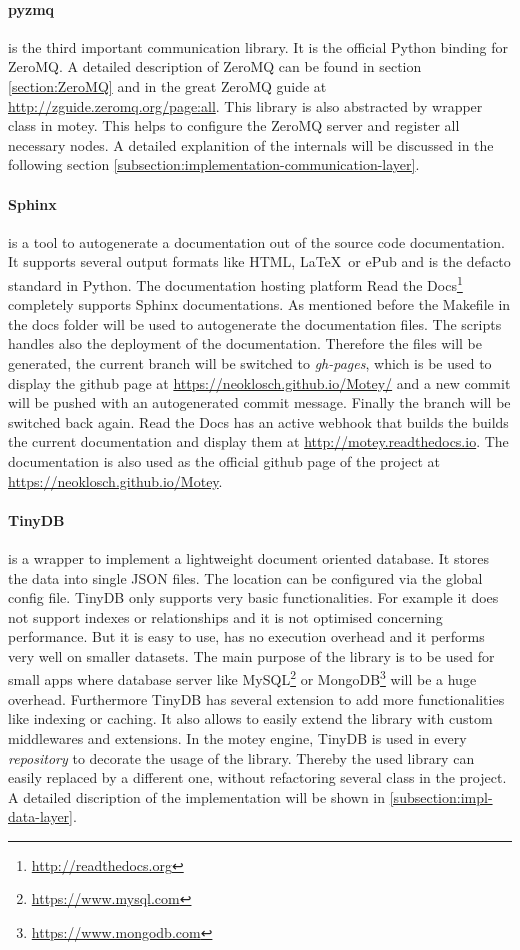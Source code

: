 \paragraph{pyzmq} is the third important communication library.
It is the official Python binding for ZeroMQ.
A detailed description of ZeroMQ can be found in section \ref{section:ZeroMQ} and in the great ZeroMQ guide at \url{http://zguide.zeromq.org/page:all}.
This library is also abstracted by wrapper class in motey.
This helps to configure the ZeroMQ server and register all necessary nodes.
A detailed explanition of the internals will be discussed in the following section \ref{subsection:implementation-communication-layer}.

\paragraph{Sphinx} is a tool to autogenerate a documentation out of the source code documentation.
It supports several output formats like \ac{HTML}, \LaTeX\ or ePub and is the defacto standard in Python.
The documentation hosting platform Read the Docs\footnote{\url{http://readthedocs.org}} completely supports Sphinx documentations.
As mentioned before the Makefile in the docs folder will be used to autogenerate the documentation files.
The scripts handles also the deployment of the documentation.
Therefore the files will be generated, the current branch will be switched to \textit{gh-pages}, which is be used to display the github page at \url{https://neoklosch.github.io/Motey/} and a new commit will be pushed with an autogenerated commit message.
Finally the branch will be switched back again.
Read the Docs has an active webhook that builds the builds the current documentation and display them at \url{http://motey.readthedocs.io}.
The documentation is also used as the official github page of the project at \url{https://neoklosch.github.io/Motey}.

\paragraph{TinyDB} is a wrapper to implement a lightweight document oriented database.
It stores the data into single \ac{JSON} files.
The location can be configured via the global config file.
TinyDB only supports very basic functionalities.
For example it does not support indexes or relationships and it is not optimised concerning performance.
But it is easy to use, has no execution overhead and it performs very well on smaller datasets.
The main purpose of the library is to be used for small apps where database server like MySQL\footnote{\url{https://www.mysql.com}} or MongoDB\footnote{\url{https://www.mongodb.com}} will be a huge overhead.
Furthermore TinyDB has several extension to add more functionalities like indexing or caching.
It also allows to easily extend the library with custom middlewares and extensions.
In the motey engine, TinyDB is used in every \textit{repository} to decorate the usage of the library.
Thereby the used library can easily replaced by a different one, without refactoring several class in the project.
A detailed discription of the implementation will be shown in \ref{subsection:impl-data-layer}.

